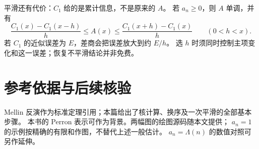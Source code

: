 \documentclass[UTF8,fontset=fandol,11pt]{ctexart}
\begin{document}
平滑还有代价：$C_1$ 给的是累计信息，不是原来的 $A$。
若 $a_n\ge0$，则 $A$ 单调，并有
\[
 \frac{C_1(x)-C_1(x-h)}h\le A(x)
 \le\frac{C_1(x+h)-C_1(x)}h\qquad(0<h<x).
\]
若 $C_1$ 的近似误差为 $E$，差商会把误差放大到约 $E/h$。
选 $h$ 时须同时控制主项变化和这一误差；恢复不平滑结论并非免费。

\section*{参考依据与后续核验}
Mellin 反演作为标准定理引用；本篇给出了核计算、换序及一次平滑的全部基本步骤。
本书的 Perron 表示可作为背景。两幅图的绘图源码随本文提供；
$a_n=1$ 的示例按精确的有限和作图，不替代上述一般估计。
$a_n=\Lambda(n)$ 的数值对照可另作延伸。
\end{document}
